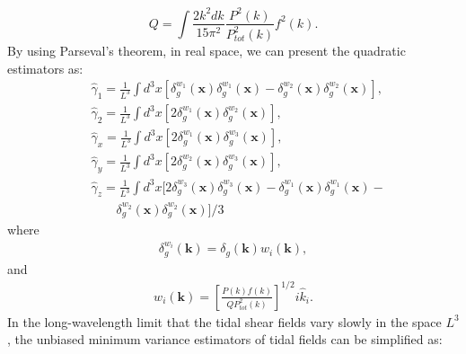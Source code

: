 \documentclass[aps,prd,twocolumn,showpacs,superscriptaddress,groupedaddress,nofootinbib]{revtex4}  %
\begin{document}
\begin{equation}
Q = \int\frac{2k^2dk}{15\pi^2}\frac{P^2(k)}{P^2_{tot}(k)}f^2(k).
\label{eq9}
\end{equation}
By using Parseval's theorem, in real space, we can present the quadratic estimators as:
\begin{equation}
\begin{split}
&\hat{\gamma}_1=\frac{1}{L^3}\int d^3x[\delta^{w_{1}}_{g}(\bm{x})\delta^{w_{1}}_{g}(\bm{x})-\delta^{w_{2}}_{g}(\bm{x})\delta^{w_{2}}_{g}(\bm{x})],\\
&\hat{\gamma}_2=\frac{1}{L^3}\int d^3x[2\delta^{w_{1}}_{g}(\bm{x})\delta^{w_{2}}_{g}(\bm{x})],\\
&\hat{\gamma}_x=\frac{1}{L^3}\int d^3x[2\delta^{w_{1}}_{g}(\bm{x})\delta^{w_{3}}_{g}(\bm{x})],\\
&\hat{\gamma}_y=\frac{1}{L^3}\int d^3x[2\delta^{w_{2}}_{g}(\bm{x})\delta^{w_{3}}_{g}(\bm{x})],\\
&\hat{\gamma}_z=\frac{1}{L^3}\int d^3x[2\delta^{w_{3}}_{g}(\bm{x})\delta^{w_{3}}_{g}(\bm{x})-\delta^{w_{1}}_{g}(\bm{x})\delta^{w_{1}}_{g}(\bm{x})-\\
&\quad\quad\delta^{w_{2}}_{g}(\bm{x})\delta^{w_{2}}_{g}(\bm{x})]/3
\end{split}
\label{eq10}
\end{equation}
where 
\begin{eqnarray}
\delta^{w_{i}}_{g}(\bm{k}) = \delta_{g}(\bm{k})w_{i}(\bm{k}),
\label{eq11}
\end{eqnarray}
and
\begin{eqnarray}
w_{i}(\bm{k}) = \left[\frac{P(k)f(k)}{QP^2_{tot}(k)}\right]^{1/2}i\hat{k}_{i}.
\label{eq12}
\end{eqnarray}
In the long-wavelength limit that the tidal shear fields vary slowly in the space $L^3$, the unbiased minimum variance estimators of tidal fields can be simplified as: 
\end{document}
